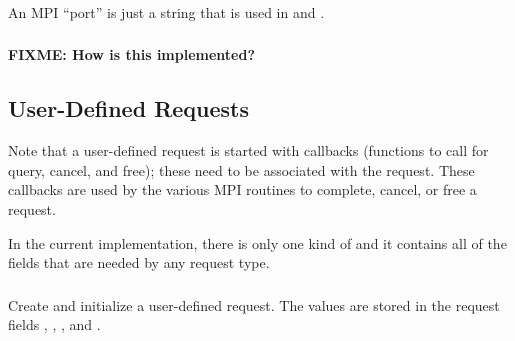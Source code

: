 \documentclass{article}
\def\fixme#1{\marginpar{FIXME:}\textbf{FIXME: #1}}
\begin{document}
\subsubsection{}
An MPI ``port'' is just a string that is used in  and
.  
%

\subsubsection{}
\fixme{How is this implemented?}


\subsection{User-Defined Requests}
\label{sec:grequest}


Note that a user-defined request is started with callbacks (functions
to call for query, cancel, and free); these need to be associated with
the request.  These callbacks are used by the various MPI routines to
complete, cancel, or free a request.

In the current implementation, there is only one kind of
 and it contains all of the fields that are needed
by any request type.  


\subsubsection{}
Create and initialize a user-defined request.  The values are stored
in the request fields ,
,
, and
. 
\end{document}
